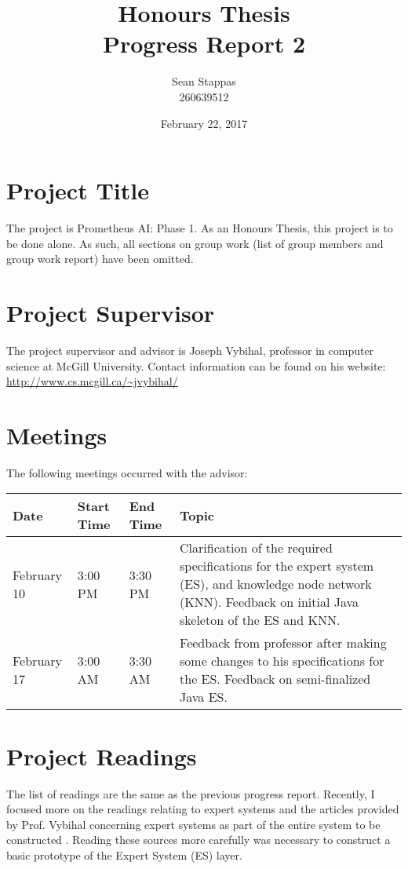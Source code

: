 \documentclass[]{article}
\title{\textbf{Honours Thesis \\ Progress Report 2}}
\author{Sean Stappas \\ 260639512}
\date{February 22, 2017}
\begin{document}
\maketitle

\section{Project Title}

The project is Prometheus AI: Phase 1. As an Honours Thesis, this project is to be done alone. As such, all sections on group work (list of group members and group work report) have been omitted.

\section{Project Supervisor}

The project supervisor and advisor is Joseph Vybihal, professor in computer science at McGill University. Contact information can be found on his website: \url{http://www.cs.mcgill.ca/~jvybihal/}

\section{Meetings}

The following meetings occurred with the advisor:

\begin{center}
	\begin{tabular}{l l l p{9.5cm}}
		\textbf{Date} & \textbf{Start Time} & \textbf{End Time} & \textbf{Topic} \\ \hline
		February 10 & 3:00 PM & 3:30 PM & Clarification of the required specifications for the expert system (ES), and knowledge node network (KNN). Feedback on initial Java skeleton of the ES and KNN. \\ \hline
		February 17 & 3:00 AM & 3:30 AM & Feedback from professor after making some changes to his specifications for the ES. Feedback on semi-finalized Java ES. \\ \hline
	\end{tabular}
\end{center}

\section{Project Readings}

The list of readings are the same as the previous progress report. Recently, I focused more on the readings relating to expert systems \cite{tripathi2011review} and the articles provided by Prof. Vybihal concerning expert systems as part of the entire system to be constructed \cite{vybihal-expert,vybihal-model,vybihal-perceptron,vybihal-swarm}. Reading these sources more carefully was necessary to construct a basic prototype of the Expert System (ES) layer.
\end{document}
